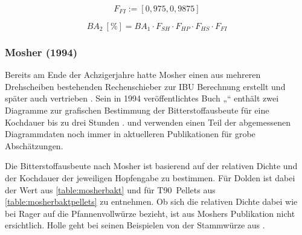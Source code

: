 \documentclass[a4paper,parskip=half]{scrartcl}
\newcommand{\BA}{\mathit{BA}}
\newcommand{\uper}{\:[\text{\%}]}
\newcommand{\FAH}{F_{\mathit{SH}}}
\newcommand{\FHF}{F_{\mathit{HP}}}
\newcommand{\FHS}{F_{\mathit{HS}}}
\newcommand{\FFil}{F_{\mathit{FI}}}
\begin{document}
\begin{equation}
\FFil := \left[0,975, 0,9875 \right]
\label{eq:garetzfil}
\end{equation}

\begin{equation}
\BA_2 \uper = BA_1 \cdot \FAH \cdot \FHF \cdot \FHS \cdot \FFil
\label{eq:garetzba2}
\end{equation}

\subsubsection*{Mosher (1994)}

Bereits am Ende der Achzigerjahre hatte Mosher einen aus mehreren Drehscheiben bestehenden Rechenschieber zur IBU Berechnung erstellt und später auch vertrieben \parencite{Mosher2022}. Sein in 1994 veröffentlichtes Buch „“ enthält zwei Diagramme zur grafischen Bestimmung der Bitterstoffausbeute für eine Kochdauer bis zu drei Stunden \parencite[160\psq]{Mosher1994}. \textcite{Holle2010} und \textcite{Thesseling2019} verwenden einen Teil der abgemessenen Diagrammdaten noch immer in aktuelleren Publikationen für grobe Abschätzungen.

Die Bitterstoffausbeute nach Mosher ist basierend auf der relativen Dichte und der Kochdauer der jeweiligen Hopfengabe zu bestimmen. Für Dolden ist dabei der Wert aus \autoref{table:mosherbakt} und für T90~Pellets aus \autoref{table:mosherbaktpellets} zu entnehmen. Ob sich die relativen Dichte dabei wie bei Rager auf die Pfannenvollwürze bezieht, ist aus Moshers Publikation nicht ersichtlich. Holle geht bei seinen Beispielen von der Stammwürze aus \parencite[53]{Holle2010}.
\end{document}
